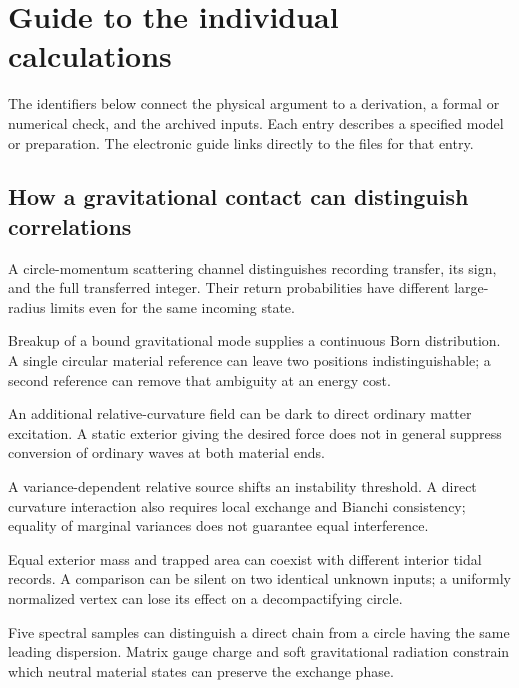 \par\medskip
\section{Guide to the individual calculations}\label{sec:individual}
The identifiers below connect the physical argument to a derivation, a formal or numerical check, and the archived inputs. Each entry describes a specified model or preparation. The electronic guide links directly to the files for that entry.

\subsection{How a gravitational contact can distinguish correlations}
\begin{description}\small
\setlength{\itemsep}{.25em}\setlength{\parskip}{0pt}
\item[\textnormal{\texttt{RES-0093}}] A circle-momentum scattering channel distinguishes recording transfer, its sign, and the full transferred integer. Their return probabilities have different large-radius limits even for the same incoming state.
\item[\textnormal{\texttt{RES-0094}}] Breakup of a bound gravitational mode supplies a continuous Born distribution. A single circular material reference can leave two positions indistinguishable; a second reference can remove that ambiguity at an energy cost.
\item[\textnormal{\texttt{RES-0095}}] An additional relative-curvature field can be dark to direct ordinary matter excitation. A static exterior giving the desired force does not in general suppress conversion of ordinary waves at both material ends.
\item[\textnormal{\texttt{RES-0096}}] A variance-dependent relative source shifts an instability threshold. A direct curvature interaction also requires local exchange and Bianchi consistency; equality of marginal variances does not guarantee equal interference.
\item[\textnormal{\texttt{RES-0097}}] Equal exterior mass and trapped area can coexist with different interior tidal records. A comparison can be silent on two identical unknown inputs; a uniformly normalized vertex can lose its effect on a decompactifying circle.
\item[\textnormal{\texttt{RES-0098}}] Five spectral samples can distinguish a direct chain from a circle having the same leading dispersion. Matrix gauge charge and soft gravitational radiation constrain which neutral material states can preserve the exchange phase.

\end{description}
